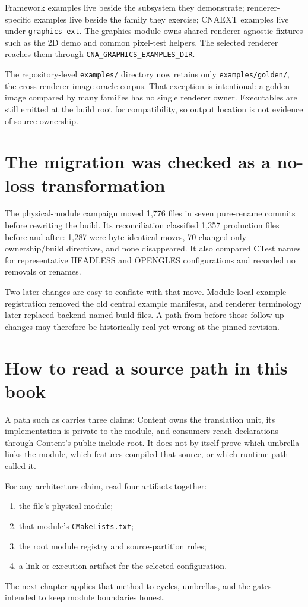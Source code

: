 Framework examples live beside the subsystem they demonstrate; renderer-specific examples live
beside the family they exercise; CNAEXT examples live under \texttt{graphics-ext}.  The graphics
module owns shared renderer-agnostic fixtures such as the 2D demo and common pixel-test helpers.
The selected renderer reaches them through \texttt{CNA\_GRAPHICS\_EXAMPLES\_DIR}.

The repository-level \texttt{examples/} directory now retains only \texttt{examples/golden/}, the
cross-renderer image-oracle corpus.  That exception is intentional: a golden image compared by many
families has no single renderer owner.  Executables are still emitted at the build root for
compatibility, so output location is not evidence of source ownership.

\section{The migration was checked as a no-loss transformation}

The physical-module campaign moved 1,776 files in seven pure-rename commits before rewriting the
build.  Its reconciliation classified 1,357 production files before and after: 1,287 were
byte-identical moves, 70 changed only ownership/build directives, and none disappeared.  It
also compared CTest names for representative HEADLESS and OPENGLES configurations and recorded no
removals or renames.

Two later changes are easy to conflate with that move.  Module-local example registration removed
the old central example manifests, and renderer terminology later replaced backend-named build
files.  A path from before those follow-up changes may therefore be historically real yet wrong at
the pinned revision.

\section{How to read a source path in this book}

A path such as
 carries three claims: Content owns the
translation unit, its implementation is private to the module, and consumers reach declarations
through Content's public include root.  It does not by itself prove which umbrella links the
module, which features compiled that source, or which runtime path called it.

For any architecture claim, read four artifacts together:

\begin{enumerate}
  \item the file's physical module;
  \item that module's \texttt{CMakeLists.txt};
  \item the root module registry and source-partition rules;
  \item a link or execution artifact for the selected configuration.
\end{enumerate}

The next chapter applies that method to cycles, umbrellas, and the gates intended to keep module
boundaries honest.
